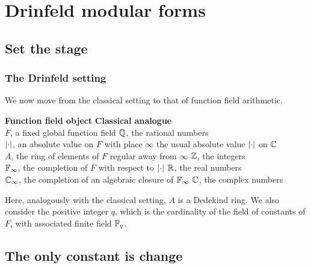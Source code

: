 \section{Drinfeld modular forms}


\subsection{Set the stage}

\begin{frame} \frametitle{The Drinfeld setting}
  We now move from the classical setting to that of function field arithmetic.

  \textbf{Function field object} \hfill \textbf{Classical analogue} \pause \\
   $F$, a fixed global function field \hfill $\mathbb{Q}$, the rational numbers \pause \\
   $\left\lvert\cdot\right\rvert$, an absolute value on $F$ with place $\infty$ \hfill the usual absolute value $\left\lvert\cdot\right\rvert$ on $\mathbb{C}$ \pause \\
   $A$, the ring of elements of $F$ regular away from $\infty$ \hfill $\mathbb{Z}$, the integers \pause \\
   $\mathbb{F}_\infty$, the completion of $F$ with respect to $\left\lvert\cdot\right\rvert$ \hfill $\mathbb{R}$, the real numbers \pause \\
   $\mathbb{C}_\infty$, the completion of an algebraic closure of $\mathbb{F}_\infty$ \hfill $\mathbb{C}$, the complex numbers \pause

  Here, analogously with the classical setting, $A$ is a Dedekind ring.
  We also consider the positive integer $q$, which is the cardinality of the field of constants of $F$, with associated finite field $\mathbb{F}_q$.
\end{frame}


\subsection{The only constant is change}

